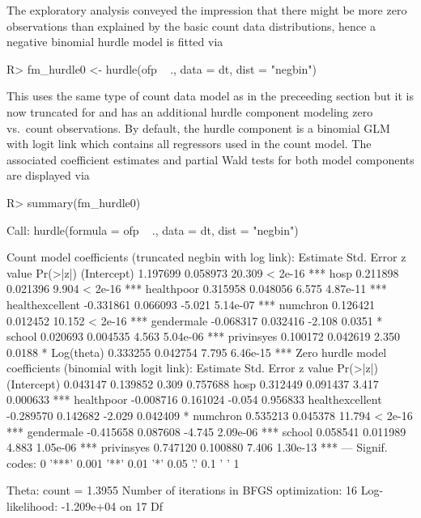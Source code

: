 \documentclass{Z}
\begin{document}
The exploratory analysis conveyed the impression that there might be more zero observations
than explained by the basic count data distributions, hence a negative
binomial hurdle model is fitted via
\begin{Schunk}
\begin{Sinput}
R> fm_hurdle0 <- hurdle(ofp ~ ., data = dt, dist = "negbin")
\end{Sinput}
\end{Schunk}
This uses the same type of count data model as in the preceeding section
but it is now truncated for  and has an additional hurdle
component modeling zero vs.\ count observations. By default, the hurdle
component is a binomial GLM with logit link which contains all regressors used in the count
model. The associated coefficient estimates and partial Wald tests for
both model components are displayed via
\begin{Schunk}
\begin{Sinput}
R> summary(fm_hurdle0)
\end{Sinput}
\begin{Soutput}
Call:
hurdle(formula = ofp ~ ., data = dt, dist = "negbin")


Count model coefficients (truncated negbin with log link):
                 Estimate Std. Error z value Pr(>|z|)    
(Intercept)      1.197699   0.058973  20.309  < 2e-16 ***
hosp             0.211898   0.021396   9.904  < 2e-16 ***
healthpoor       0.315958   0.048056   6.575 4.87e-11 ***
healthexcellent -0.331861   0.066093  -5.021 5.14e-07 ***
numchron         0.126421   0.012452  10.152  < 2e-16 ***
gendermale      -0.068317   0.032416  -2.108   0.0351 *  
school           0.020693   0.004535   4.563 5.04e-06 ***
privinsyes       0.100172   0.042619   2.350   0.0188 *  
Log(theta)       0.333255   0.042754   7.795 6.46e-15 ***
Zero hurdle model coefficients (binomial with logit link):
                 Estimate Std. Error z value Pr(>|z|)    
(Intercept)      0.043147   0.139852   0.309 0.757688    
hosp             0.312449   0.091437   3.417 0.000633 ***
healthpoor      -0.008716   0.161024  -0.054 0.956833    
healthexcellent -0.289570   0.142682  -2.029 0.042409 *  
numchron         0.535213   0.045378  11.794  < 2e-16 ***
gendermale      -0.415658   0.087608  -4.745 2.09e-06 ***
school           0.058541   0.011989   4.883 1.05e-06 ***
privinsyes       0.747120   0.100880   7.406 1.30e-13 ***
---
Signif. codes:  0 '***' 0.001 '**' 0.01 '*' 0.05 '.' 0.1 ' ' 1 

Theta: count = 1.3955
Number of iterations in BFGS optimization: 16 
Log-likelihood: -1.209e+04 on 17 Df
\end{Soutput}
\end{Schunk}
\end{document}
